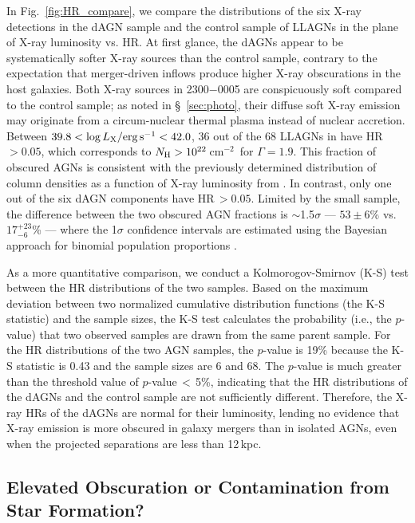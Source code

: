 \documentclass[iop,revtex4,twocolumn,apj,numberedappendix,appendixfloats]{emulateapj}
\newcommand{\cmsq}{cm$^{-2}$}
\begin{document}
In Fig.~\ref{fig:HR_compare}, we compare the distributions of the six X-ray detections in the dAGN sample and the control sample of LLAGNs in the plane of X-ray luminosity vs. HR. At first glance, the dAGNs appear to be systematically softer X-ray sources than the control sample, contrary to the expectation that merger-driven inflows produce higher X-ray obscurations in the host galaxies. Both X-ray sources in 2300$-$0005 are conspicuously soft compared to the control sample; as noted in \S~\ref{sec:photo}, their diffuse soft X-ray emission may originate from a circum-nuclear thermal plasma instead of nuclear accretion. Between $39.8 < \log L_{\rm X}/{\rm erg\,s^{-1}} < 42.0$, 36 out of the 68 LLAGNs in \citet{She17} have HR\,$> 0.05$, which corresponds to $N_{\rm H} > 10^{22}$\,\cmsq\ for $\Gamma = 1.9$. This fraction of obscured AGNs is consistent with the previously determined distribution of column densities as a function of X-ray luminosity from \citet{Ueda03}. In contrast, only one out of the six dAGN components have HR\,$> 0.05$. Limited by the small sample, the difference between the two obscured AGN fractions is $\sim$1.5$\sigma$ --- $53\pm6$\% vs. $17^{+23}_{-6}$\% --- where the 1$\sigma$ confidence intervals are estimated using the Bayesian approach for binomial population proportions \citep{Cameron11}. 

As a more quantitative comparison, we conduct a Kolmorogov-Smirnov (K-S) test between the HR distributions of the two samples. Based on the maximum deviation between two normalized cumulative distribution functions (the K-S statistic) and the sample sizes, the K-S test calculates the probability (i.e., the $p$-value) that two observed samples are drawn from the same parent sample. For the HR distributions of the two AGN samples, the $p$-value is 19\% because the K-S statistic is 0.43 and the sample sizes are 6 and 68. The $p$-value is much greater than the threshold value of $p$-value\,$<$\,5\%, indicating that the HR distributions of the dAGNs and the control sample are not sufficiently different. Therefore, the X-ray HRs of the dAGNs are normal for their luminosity, lending no evidence that X-ray emission is more obscured in galaxy mergers than in isolated AGNs, even when the projected separations are less than 12\,kpc.

\subsection{Elevated Obscuration or Contamination from Star Formation?} \label{sec:deficit}
\end{document}
